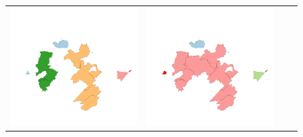 \begin{figure}[p]
\begin{tabularx}{1\textwidth}{XXXX}
\includegraphics[width=1\linewidth]{images/ch6/contig/07}&
\includegraphics[width=1\linewidth]{images/ch6/contig/08} \\

\end{tabularx}
\end{figure}
